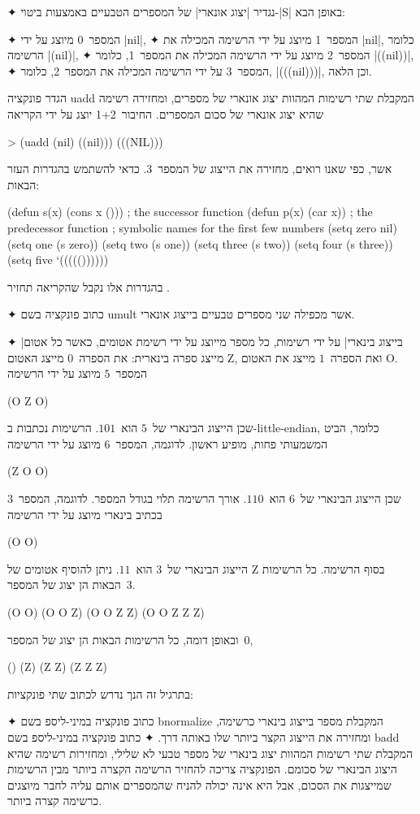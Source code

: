 \begin{enumerate}
  ✦ נגדיר \ע|יצוג אונארי| של המספרים הטבעיים באמצעות ביטוי-\E|S| באופן הבא:
  \begin{itemize}
    ✦ המספר~0 מיוצג על ידי \E|nil|,
    ✦ המספר~1 מיוצג על ידי הרשימה המכילה את \E|nil|, כלומר הרשימה \E|(nil)|,
    ✦ המספר~2 מיוצג על ידי הרשימה המכילה את המספר~1, כלומר \E|((nil))|,
    ✦ המספר~3 על ידי הרשימה המכילה את המספר~2, כלומר, \E|(((nil)))|,
    וכן הלאה.
  \end{itemize}
  הגדר פונקציה uadd המקבלת שתי רשימות המהוות יצוג אונארי של מספרים,
  ומחזירה רשימה שהיא יצוג אונארי של סכום המספרים. החיבור~1+2 יוצג על ידי
  הקריאה
  \begin{LISP}
> (uadd (nil) ((nil)))
(((NIL)))
\end{LISP}
  אשר, כפי שאנו רואים, מחזירה את הייצוג של המספר~3.
  כדאי להשתמש בהגדרות העזר הבאות:
  \begin{LISP}
(defun s(x) (cons x ())) ; the successor function
(defun p(x) (car x)) ; the predecessor function
; symbolic names for the first few numbers
(setq zero nil)
(setq one (s zero))
(setq two (s one))
(setq three (s two))
(setq four (s three))
(setq five ‘((((())))))
\end{LISP}
  בהגדרות אלו נקבל שהקריאה
  תחזיר \lisp{((((()))))}.

  ✦ כתוב פונקציה בשם umult אשר מכפילה שני מספרים טבעיים בייצוג אונארי.

  ✦ \ע|בייצוג בינארי| על ידי רשימות, כל מספר מייוצג על ידי רשימת אטומים, כאשר
  כל אטום מייצג ספרה בינארית: את הספרה~$0$ מייצג האטום Z, ואת הספרה~$1$ מייצג
  את האטום O. המספר~$5$ מיוצג על ידי הרשימה \begin{LISP}
(O Z O)
\end{LISP} שכן הייצוג הבינארי של~$5$ הוא~$101$. הרשימות נכתבות ב-little-endian,
  כלומר, הביט המשמעותי פחות, מופיע ראשון. לדוגמה, המספר~$6$ מיוצג על ידי הרשימה
  \begin{LISP}
 (Z O O)
 \end{LISP}
  שכן הייצוג הבינארי של~$6$ הוא~$110$. אורך הרשימה תלוי בגודל המספר.
  לדוגמה, המספר~$3$ בכתיב בינארי מיוצג על ידי הרשימה
  \begin{LISP}
 (O O)
 \end{LISP} הייצוג הבינארי של~$3$ הוא~$11$. ניתן להוסיף אטומים של Z בסוף
  הרשימה. כל הרשימות הבאות הן יצוג של המספר~$3$.
  \begin{LISP}
(O O)
(O O Z)
(O O Z Z)
(O O Z Z Z)
\end{LISP}
  ובאופן דומה, כל הרשימות הבאות הן יצוג של המספר~$0$,
  \begin{LISP}
()
(Z)
(Z Z)
(Z Z Z)
\end{LISP}
  בתרגיל זה הנך נדרש לכתוב שתי פונקציות:
  \begin{itemize}
    ✦ כתוב פונקציה במיני-ליספ בשם bnormalize המקבלת מספר בייצוג בינארי כרשימה,
    ומחזירה את הייצוג הקצר ביותר שלו באותה דרך.
    ✦ כתוב פונקציה במיני-ליספ בשם badd המקבלת שתי רשימות המהוות יצוג בינארי
    של מספר טבעי לא שלילי, ומחזירות רשימה שהיא היצוג הבינארי של סכומם.
    הפונקציה צריכה להחזיר הרשימה הקצרה ביותר מבין הרשימות שמייצגות את הסכום,
    אבל היא אינה יכולה להניח שהמספרים אותם עליה לחבר מיוצגים כרשימה קצרה
    ביותר.
  \end{itemize}


\end{enumerate}
